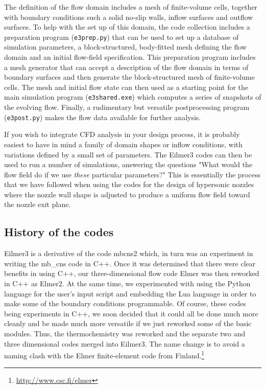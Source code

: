 \documentclass[12pt,a4paper,twoside]{article}
\begin{document}
\medskip
The definition of the flow domain includes a mesh of finite-volume cells,
together with boundary conditions such a solid no-slip walls, inflow surfaces and outflow surfaces.
To help with the set up of this domain, the code collection includes a preparation program (\texttt{e3prep.py}) 
that can be used to set up a database of simulation parameters, 
a block-structured, body-fitted mesh defining the flow domain and an initial flow-field specification.
This preparation program includes a mesh generator that can accept a description of the flow domain
in terms of boundary surfaces and then generate the block-structured mesh of finite-volume cells.
The mesh and initial flow state can then used as a starting point for the main simulation program (\texttt{e3shared.exe})
which computes a series of snapshots of the evolving flow.
Finally, a rudimentary but versatile postprocessing program (\texttt{e3post.py}) makes the flow data
available for further analysis.

\medskip
If you wish to integrate CFD analysis in your design process, it is probably easiest to have in mind
a family of domain shapes or inflow conditions, with variations defined by a small set of parameters.
The Eilmer3 codes can then be used to run a number of simulations, answering the questions 
"What would the flow field do if we use \textit{these} particular parameters?"
This is essentially the process that we have followed when using the codes for the design of hypersonic nozzles
\cite{chan_etal_2014b} where the nozzle wall shape is adjusted to produce a uniform flow field 
toward the nozzle exit plane.

\subsection{History of the codes}
%
Eilmer3 is a derivative of the code mbcns2 which, in turn was an experiment in writing
the mb\_cns code in C++.
Once it was determined that there were clear benefits in using C++,
our three-dimensional flow code Elmer was then reworked in C++ as Elmer2.
At the same time, we experimented with using the Python language for the user's input script and 
embedding the Lua language in order to make some of the boundary conditions programmable.
Of course, these codes being experiments in C++, we soon decided that it could all be done
much more cleanly and be made much more versatile if we just reworked some of the basic modules.
Thus, the thermochemistry was reworked and the separate two and three dimensional codes merged
into Eilmer3.
The name change is to avoid a naming clash with the Elmer finite-element code 
from Finland.\footnote{\url{http://www.csc.fi/elmer}}
\end{document}
